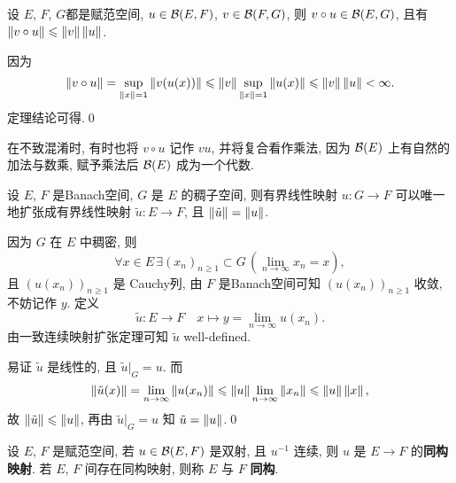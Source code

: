     \begin{Theorem}
         设 $ E $, $ F $, $ G $都是赋范空间,  $ u\in\mathcal{B}(E, F) $, $ v\in\mathcal{B}(F, G) $, 则 $ v\circ u\in\mathcal{B}(E, G) $, 且有 $ \left\| v\circ u \right\|\leqslant\left\| v \right\|\left\| u \right\| $.
    \end{Theorem}
    \begin{Proof}
        因为
        \[
            \left\| v\circ u \right\|=\sup_{\left\| x \right\|=1}\left\| v(u(x)) \right\|\leqslant\left\| v \right\|\sup_{\left\| x \right\|=1}\left\| u(x) \right\|\leqslant\left\| v \right\|\left\| u \right\|<\infty.
        \]
        定理结论可得.\qed
    \end{Proof}

    \begin{Remark}
        在不致混淆时, 有时也将 $ v\circ u $ 记作 $ vu $, 并将复合看作乘法, 因为 $ \mathcal{B}(E) $ 上有自然的加法与数乘, 赋予乘法后 $ \mathcal{B}(E) $ 成为一个代数.
    \end{Remark}

    \begin{Theorem}
        设 $ E $, $ F $ 是Banach空间,  $ G $ 是 $ E $ 的稠子空间, 则有界线性映射 $ u: G\to F $ 可以唯一地扩张成有界线性映射 $ \tilde{u}:E\to F $, 且 $ \left\| \tilde{u} \right\|=\left\| u \right\| $.
   \end{Theorem}
   \begin{Proof}
        因为 $ G $ 在 $ E $ 中稠密, 则
        \[
            \forall x\in E\,\exists(x_{n})_{n\geqslant1}\subset G\,(\lim_{n\to\infty}x_{n}=x),
        \]
        且 $ (u(x_{n}))_{n\geqslant1} $ 是 Cauchy列, 由 $ F $ 是Banach空间可知 $ (u(x_{n}))_{n\geqslant1} $ 收敛, 不妨记作 $ y $. 定义
        \[
            \tilde{u}: E\to F\quad x\mapsto y=\lim_{n\to\infty}u(x_{n}).
        \]
        由一致连续映射扩张定理可知 $ \tilde{u} $ well-defined.

        易证 $ \tilde{u} $ 是线性的, 且 $ \tilde{u}|_{G}=u $. 而
        \[
            \left\| \tilde{u}(x) \right\|=\lim_{n\to\infty}\left\| u(x_{n}) \right\|\leqslant\left\| u \right\|\lim_{n\to\infty}\left\| x_{n} \right\|\leqslant\left\| u \right\|\left\| x \right\|,
        \]
        故 $ \left\| \tilde{u} \right\|\leqslant\left\| u \right\| $, 再由 $ \tilde{u}|_{G}=u $ 知 $ \tilde{u}=\left\| u \right\| $.\qed

    \end{Proof}

    \begin{Definition}[同构]\label{def:同构}
         设 $ E $, $ F $ 是赋范空间, 若 $ u\in\mathcal{B}(E, F) $ 是双射, 且 $ u^{-1} $ 连续, 则 $ u $ 是 $ E\to F $ 的\textbf{同构映射}. 若 $ E $, $ F $ 间存在同构映射, 则称 $ E $ 与 $ F $ \textbf{同构}.
    \end{Definition}

